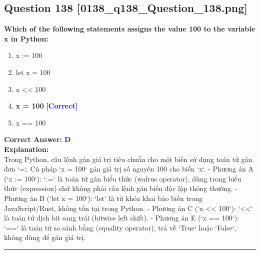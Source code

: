 \documentclass[11pt,a4paper]{article}
\begin{document}
\begin{minipage}{\textwidth}
\subsection*{Question 138 \quad \footnotesize{[0138_q138_Question_138.png]}}
\noindent \textbf{Which of the following statements assigns the value 100 to the variable x in Python:}

\begin{enumerate}[label=\Alph*.]
    \item x := 100
    \item let x = 100
    \item x << 100
    \item \textbf{x = 100} \hfill \textcolor{blue}{\textbf{[Correct]}}
    \item x == 100
\end{enumerate}

\noindent \textbf{Correct Answer:} \textcolor{blue}{\textbf{D}} \\[4pt]
\noindent \textbf{Explanation:}\\
Trong Python, câu lệnh gán giá trị tiêu chuẩn cho một biến sử dụng toán tử gán đơn `=`. Cú pháp `x = 100` gán giá trị số nguyên 100 cho biến `x`.\newline
- Phương án A (`x := 100`): `:=` là toán tử gán biểu thức (walrus operator), dùng trong biểu thức (expression) chứ không phải câu lệnh gán biến độc lập thông thường.\newline
- Phương án B (`let x = 100`): `let` là từ khóa khai báo biến trong JavaScript/Rust, không tồn tại trong Python.\newline
- Phương án C (`x << 100`): `<<` là toán tử dịch bit sang trái (bitwise left shift).\newline
- Phương án E (`x == 100`): `==` là toán tử so sánh bằng (equality operator), trả về `True` hoặc `False`, không dùng để gán giá trị.
\end{minipage}
\vspace{0.8cm}
\hrule
\vspace{0.5cm}
\end{document}
